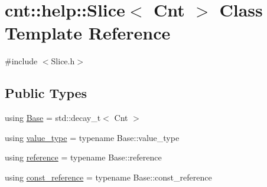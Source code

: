 \hypertarget{classcnt_1_1help_1_1Slice}{}\section{cnt\+:\+:help\+:\+:Slice$<$ Cnt $>$ Class Template Reference}
\label{classcnt_1_1help_1_1Slice}


{\ttfamily \#include $<$Slice.\+h$>$}

\subsection*{Public Types}
{\bf }\par
\begin{DoxyCompactItemize}
\item 
using \hyperlink{classcnt_1_1help_1_1Slice_a485438785457de81fe42a4b07ec4ad32}{Base} = std\+::decay\+\_\+t$<$ Cnt $>$
\item 
using \hyperlink{classcnt_1_1help_1_1Slice_a7d0f8ecb603e485ce53f12cce307821d}{value\+\_\+type} = typename Base\+::value\+\_\+type
\item 
using \hyperlink{classcnt_1_1help_1_1Slice_a5e5e9b497c124710fcfe1e185e4801f3}{reference} = typename Base\+::reference
\item 
using \hyperlink{classcnt_1_1help_1_1Slice_aed38e8e92115049f9c3b78ee67bdc5c4}{const\+\_\+reference} = typename Base\+::const\+\_\+reference
\end{DoxyCompactItemize}

